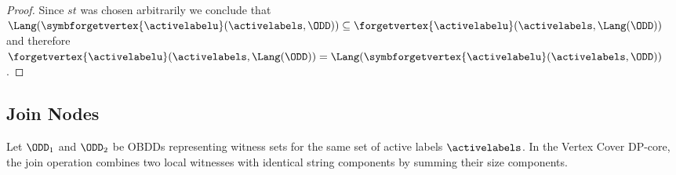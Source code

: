 \begin{proof}
    Since $st$ was chosen arbitrarily we conclude that $\Lang(\symbforgetvertex{\activelabelu}(\activelabels,\ODD)) \subseteq \forgetvertex{\activelabelu}(\activelabels,\Lang(\ODD))$ and therefore $\forgetvertex{\activelabelu}(\activelabels, \Lang(\ODD)) = \Lang(\symbforgetvertex{\activelabelu}(\activelabels, \ODD))$.
\end{proof}




\subsection{Join Nodes}

Let $\ODD_1$ and $\ODD_2$ be OBDDs representing witness sets for the same set of
active labels $\activelabels$. In the {\sc Vertex Cover} DP-core, the join
operation combines two local witnesses with identical string components by
summing their size components.

